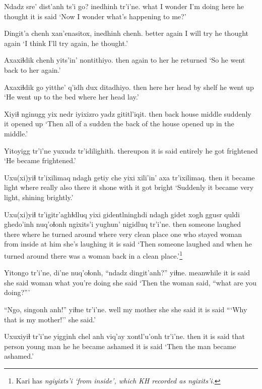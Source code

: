 \documentclass[12pt]{article}
\begin{document}
\gll Ndadz sre'  dist'anh ts'i go? inedhinh tr'i'ne.
what {I wonder} {I'm doing} {} here {he thought} {it is said}
\glt `Now I wonder what's happening to me?'
\glend

\gll Dingit'a chenh  xan'enasitox, inedhinh chenh.
better  again  {I will try} {he thought} again
\glt `I think I'll try again, he thought.'
\glend

\gll Axaxiɬdik chenh yits'in' nontithiyo.
then  again {to her} {he returned}
\glt `So he went back to her again.'
\glend

\gll Axaxiɬdik go yitthe' q'idh dux ditadhiyo.
then  here {her head} by shelf {he went up}
\glt `He went up to the bed where her head lay.'
\glend

\gll Xiyiɬ nginugg yix nedr  iyixizro {yadz gititl'iqit.}
then back  house middle  suddenly {it opened up}
\glt `Then all of a sudden the back of the house opened up in the middle.'
\glend

\gll Yitoyigg tr'i'ne yuxudz tr'idilighith.
thereupon {it is said} entirely {he got frightened}
\glt `He became frightened.'
\glend

\gll Uxu(xi)yiɬ tr'ixilimaq   ndagh getiy che yixi xili'in'  axa tr'ixilimaq.
then {it became light} where  really also there {it shone} with {it got bright}
\glt `Suddenly it became very light, shining brightly.'
\glend

\gll Uxu(xi)yiɬ tr'igitr'aghɬdluq  yixi gidentlninghdi ndagh gidet {xogh ggusr quldi} ghedo'inh  nuq'oɬonh ngixits'i yughun' nigidluq tr'i'ne.
then  {someone laughed} there {where he turned around} where very {clean place} {one who stayed} woman {from inside} {at him} {she's laughing} {it is said}
\glt `Then someone laughed and when he turned around there was a woman back in a clean place.'\footnote{Kari has \em ngiyixts'i \em `from inside', which KH recorded as \em ngixits'i.}
\glend

\gll Yitongo tr'i'ne, di'ne nuq'oɬonh, ``ndadz dingit'anh?'' yiɬne.
meanwhile {it is said} {she said} woman what  {you're doing} {she said}
\glt `Then the woman said, ``what are you doing?'''
\glend

\gll ``Ngo,  singonh anh!''  yiɬne  tr'i'ne.
well {my mother} she {she said} {it is said} 
\glt ```Why that is my mother!'' she said.'
\glend

\gll Uxuxiyiɬ tr'i'ne yigginh chel anh {viq'ay xontl'u'onh} tr'i'ne.
then  {it is said} {that person} {young man} he {he became ashamed} {it is said}
\glt `Then the man became ashamed.'
\glend
\end{document}
